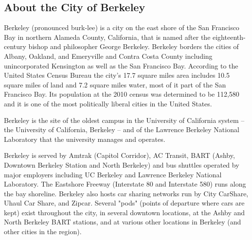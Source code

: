 
\vspace{3mm}
\subsection*{About the City of Berkeley}

Berkeley (pronounced burk-lee) is a city on the east shore of the San Francisco Bay in northern Alameda County, California, that is named after the eighteenth-century bishop and philosopher George Berkeley. Berkeley borders the cities of Albany, Oakland, and Emeryville and Contra Costa County including unincorporated Kensington as well as the San Francisco Bay. According to the United States Census Bureau the city's 17.7 square miles area includes 10.5 square miles of land and 7.2 square miles water, most of it part of the San Francisco Bay. Its population at the 2010 census was determined to be 112,580 and it is one of the most politically liberal cities in the United States.

Berkeley is the site of the oldest campus in the University of California system – the University of California, Berkeley – and of the Lawrence Berkeley National Laboratory that the university manages and operates. 

Berkeley is served by Amtrak (Capitol Corridor), AC Transit, BART (Ashby, Downtown Berkeley Station and North Berkeley) and bus shuttles operated by major employers including UC Berkeley and Lawrence Berkeley National Laboratory. The Eastshore Freeway (Interstate 80 and Interstate 580) runs along the bay shoreline. Berkeley also hosts car sharing networks run by City CarShare, Uhaul Car Share, and Zipcar. Several "pods" (points of departure where cars are kept) exist throughout the city, in several downtown locations, at the Ashby and North Berkeley BART stations, and at various other locations in Berkeley (and other cities in the region).

